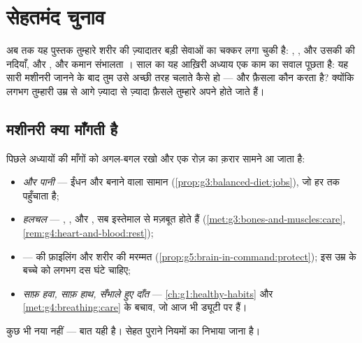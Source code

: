 \chapter{सेहतमंद चुनाव}\label{ch:g5:healthy-choices}

अब तक यह पुस्तक तुम्हारे शरीर की ज़्यादातर बड़ी सेवाओं का चक्कर लगा
चुकी है: , ,  और उसकी  की नदियाँ,  और
, और कमान संभालता । साल का यह आख़िरी अध्याय एक काम का
सवाल पूछता है: यह सारी मशीनरी जानने के बाद तुम उसे अच्छी तरह चलाते कैसे
हो --- और फ़ैसला कौन करता है? क्योंकि लगभग तुम्हारी उम्र से आगे
ज़्यादा से ज़्यादा फ़ैसले तुम्हारे अपने होते जाते हैं।

\section{मशीनरी क्या माँगती है}

\begin{proposition}[शरीर का रोज़ का क़रार]\label{prop:g5:healthy-choices:contract}
पिछले अध्यायों की माँगों को अगल-बगल रखो और एक रोज़ का क़रार सामने आ जाता
है:
\begin{itemize}
  \item \emph{ और पानी} --- ईंधन और बनाने वाला सामान
        (\cref{prop:g3:balanced-diet:jobs}), जो  हर  तक
        पहुँचाता है;
  \item \emph{हलचल} --- , ,  और , सब
        इस्तेमाल से मज़बूत होते हैं
        (\cref{met:g3:bones-and-muscles:care},
        \cref{rem:g4:heart-and-blood:rest});
  \item \emph{} ---  की फ़ाइलिंग और शरीर की मरम्मत
        (\cref{prop:g5:brain-in-command:protect}); इस उम्र के बच्चे को
        लगभग दस घंटे चाहिए;
  \item \emph{साफ़ हवा, साफ़ हाथ, सँभाले हुए दाँत} ---
        \cref{ch:g1:healthy-habits} और \cref{met:g4:breathing:care}
        के बचाव, जो आज भी ड्यूटी पर हैं।
\end{itemize}
कुछ भी नया नहीं --- बात यही है। सेहत पुराने नियमों का निभाया जाना है।
\end{proposition}
\admitted

